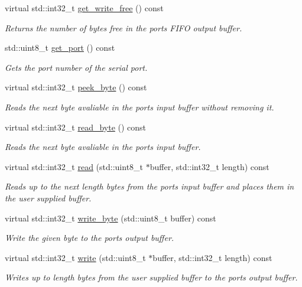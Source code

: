 \begin{DoxyCompactItemize}
virtual std\+::int32\+\_\+t \hyperlink{classpros_1_1Serial_a08daf4a3df3e3c4924d66d0b2eb91538}{get\+\_\+write\+\_\+free} () const
\begin{DoxyCompactList}\small\item\em Returns the number of bytes free in the port\textquotesingle{}s F\+I\+FO output buffer. \end{DoxyCompactList}\item 
std\+::uint8\+\_\+t \hyperlink{classpros_1_1Serial_a74560cbf9ec7bc3f49cbf54aadb049a9}{get\+\_\+port} () const
\begin{DoxyCompactList}\small\item\em Gets the port number of the serial port. \end{DoxyCompactList}\item 
virtual std\+::int32\+\_\+t \hyperlink{classpros_1_1Serial_a5ec51db5a7726f2220723971c1999881}{peek\+\_\+byte} () const
\begin{DoxyCompactList}\small\item\em Reads the next byte avaliable in the port\textquotesingle{}s input buffer without removing it. \end{DoxyCompactList}\item 
virtual std\+::int32\+\_\+t \hyperlink{classpros_1_1Serial_a59c62f236867ec160668389a47d09a5e}{read\+\_\+byte} () const
\begin{DoxyCompactList}\small\item\em Reads the next byte avaliable in the port\textquotesingle{}s input buffer. \end{DoxyCompactList}\item 
virtual std\+::int32\+\_\+t \hyperlink{classpros_1_1Serial_a0d42f31fa7a5bd936010a346167c1946}{read} (std\+::uint8\+\_\+t $\ast$buffer, std\+::int32\+\_\+t length) const
\begin{DoxyCompactList}\small\item\em Reads up to the next length bytes from the port\textquotesingle{}s input buffer and places them in the user supplied buffer. \end{DoxyCompactList}\item 
virtual std\+::int32\+\_\+t \hyperlink{classpros_1_1Serial_a16477199d136d4f2ccbc73281d03965b}{write\+\_\+byte} (std\+::uint8\+\_\+t buffer) const
\begin{DoxyCompactList}\small\item\em Write the given byte to the port\textquotesingle{}s output buffer. \end{DoxyCompactList}\item 
virtual std\+::int32\+\_\+t \hyperlink{classpros_1_1Serial_a865313d3b482d9ffdd380edc36273b24}{write} (std\+::uint8\+\_\+t $\ast$buffer, std\+::int32\+\_\+t length) const
\begin{DoxyCompactList}\small\item\em Writes up to length bytes from the user supplied buffer to the port\textquotesingle{}s output buffer. \end{DoxyCompactList}\end{DoxyCompactItemize}


